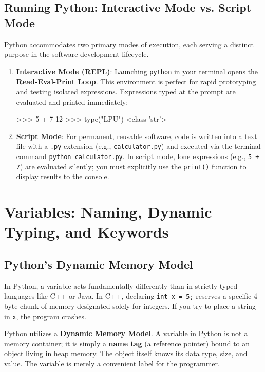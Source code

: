 \subsection{Running Python: Interactive Mode vs. Script Mode}

Python accommodates two primary modes of execution, each serving a distinct purpose in the software development lifecycle.

\begin{enumerate}[leftmargin=1.5em]
    \item \textbf{Interactive Mode (REPL)}: Launching \texttt{python} in your terminal opens the \textbf{Read-Eval-Print Loop}. This environment is perfect for rapid prototyping and testing isolated expressions. Expressions typed at the prompt are evaluated and printed immediately:
    \begin{outputbox}
>>> 5 + 7
12
>>> type("LPU")
<class 'str'>
    \end{outputbox}
    \item \textbf{Script Mode}: For permanent, reusable software, code is written into a text file with a \texttt{.py} extension (e.g., \texttt{calculator.py}) and executed via the terminal command \texttt{python calculator.py}. In script mode, lone expressions (e.g., \texttt{5 + 7}) are evaluated silently; you must explicitly use the \texttt{print()} function to display results to the console.
\end{enumerate}

\section{Variables: Naming, Dynamic Typing, and Keywords}

\subsection{Python's Dynamic Memory Model}

In Python, a variable acts fundamentally differently than in strictly typed languages like C++ or Java. In C++, declaring \texttt{int x = 5;} reserves a specific 4-byte chunk of memory designated solely for integers. If you try to place a string in \texttt{x}, the program crashes.

Python utilizes a \textbf{Dynamic Memory Model}. A variable in Python is not a memory container; it is simply a \textbf{name tag} (a reference pointer) bound to an object living in heap memory. The object itself knows its data type, size, and value. The variable is merely a convenient label for the programmer.

